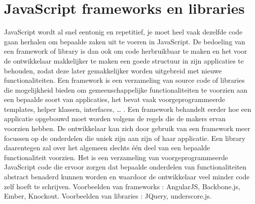  \section{JavaScript frameworks en libraries} \label{section:frameworkslibraries}

JavaScript wordt al snel eentonig en repetitief, je moet heel vaak dezelfde code gaan herhalen om bepaalde zaken uit te voeren in JavaScript. De bedoeling van een framework of library is dan ook om code herbruikbaar te maken en het voor de ontwikkelaar makkelijker te maken een goede structuur in zijn applicaties te behouden, zodat deze later gemakkelijker worden uitgebreid met nieuwe functionaliteiten. 
Een framework is een verzameling van source code of libraries die mogelijkheid bieden om gemeenschappelijke functionaliteiten te voorzien aan een bepaalde soort van applicaties, het bevat vaak voorgeprogrammeerde templates, helper klassen, interfaces, … . Een framework behandelt eerder hoe een applicatie opgebouwd moet worden volgens de regels die de makers ervan voorzien hebben. De ontwikkelaar kan zich door gebruik van een framework meer focussen op de onderdelen die uniek zijn aan zijn of haar applicatie.
Een library daarentegen zal over het algemeen slechts één deel van een bepaalde functionaliteit voorzien. Het is een verzameling van voorgeprogrammeerde JavaScript code die ervoor zorgen dat bepaalde onderdelen van functionaliteiten abstract benaderd kunnen worden en waardoor de ontwikkelaar veel minder code zelf hoeft te schrijven. 
Voorbeelden van frameworks : AngularJS, Backbone.js, Ember, Knockout.
Voorbeelden van libraries : JQuery, underscore.js.


